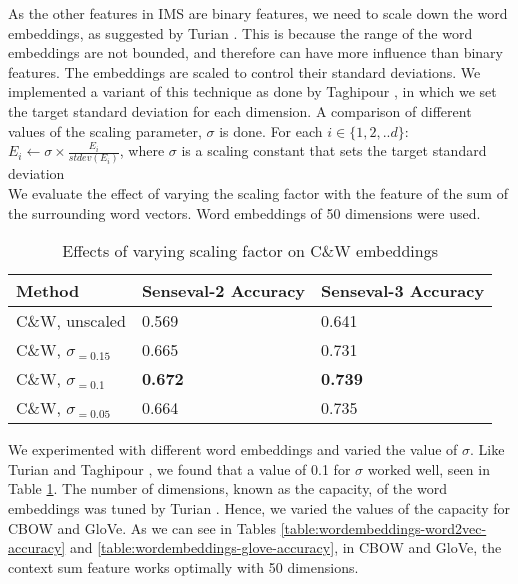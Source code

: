 \documentclass[11pt]{article}
\begin{document}
As the other features in IMS are binary features, we need to scale down the word embeddings, as suggested by Turian . This is because the range of the word embeddings are not bounded, and therefore can have more influence than binary features. The embeddings are scaled to control their standard deviations. We implemented a variant of this technique as done by Taghipour , in which we set the target standard deviation for each dimension. A comparison of different values of the scaling parameter, $\sigma$ is done. For each $i \in \{1, 2, .. d\}$:
\\

$E_{i} \leftarrow \sigma \times \frac{E_{i}}{stdev(E_{i})} $, where $\sigma$ is a scaling constant that sets the target standard deviation
\\ 

We evaluate the effect of varying the scaling factor with the feature of the sum of the surrounding word vectors. Word embeddings of 50 dimensions were used.



\begin{table}[ht]
	\caption{Effects of varying scaling factor on C\&W embeddings }
	\label{table:wordembeddings-accuracy}
	\begin{center}
		\begin{tabular}{| p{7cm} | p{4cm} | p{4cm} |}
			\hline
			Method & Senseval-2 Accuracy & Senseval-3 Accuracy \\
			\hline
			C\&W, unscaled & 0.569 & 0.641 \\
			\hline
			C\&W, $\sigma _{=0.15}$ & 0.665 & 0.731 \\
			\hline
			C\&W, $\sigma _{=0.1}$ & {\bf0.672} & {\bf0.739} \\
			\hline
			C\&W, $\sigma _{=0.05}$ & 0.664 & 0.735 \\
			\hline
			
		\end{tabular}
	\end{center}
\end{table}
We experimented with different word embeddings and varied the value of $\sigma$. Like Turian  and Taghipour , we found that a value of 0.1 for $\sigma$ worked well, seen in Table \ref{table:wordembeddings-accuracy}. The number of dimensions, known as the capacity, of the word embeddings was tuned by Turian . Hence, we varied the values of the capacity for CBOW and GloVe. As we can see in Tables \ref{table:wordembeddings-word2vec-accuracy} and \ref{table:wordembeddings-glove-accuracy}, in CBOW and GloVe, the context sum feature works optimally with 50 dimensions. 
\end{document}
